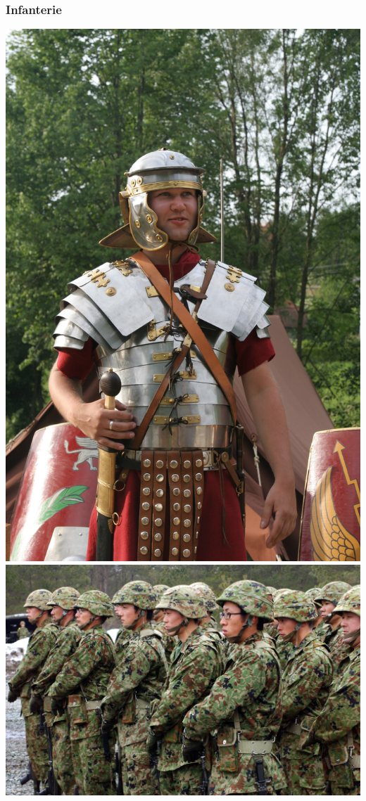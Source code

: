 \documentclass{article}
\begin{document}
\subsubsection{Infanterie}
\includegraphics[trim=0cm 0cm 0cm 15cm, clip=true, width=0.42\paperwidth]{../ressources/Roman_soldier}
\includegraphics[width=0.55\paperwidth]{../ressources/JGDSF_Soldiers}
\cite{infantery}
\end{document}
